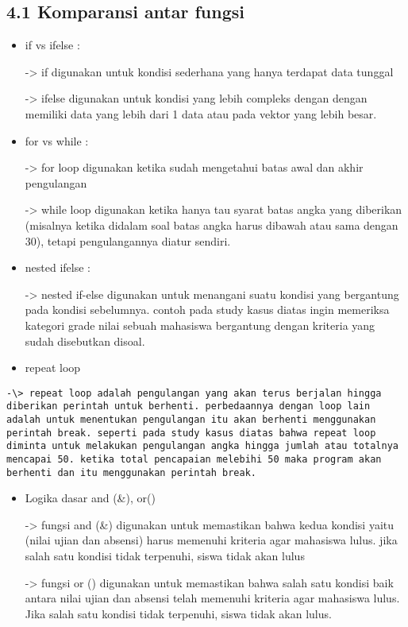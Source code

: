 \documentclass[
]{article}
\begin{document}
\subsection{4.1 Komparansi antar fungsi}\label{komparansi-antar-fungsi}

\begin{itemize}
\item
  if vs ifelse :

  -\textgreater{} if digunakan untuk kondisi sederhana yang hanya
  terdapat data tunggal

  -\textgreater{} ifelse digunakan untuk kondisi yang lebih compleks
  dengan dengan memiliki data yang lebih dari 1 data atau pada vektor
  yang lebih besar.
\item
  for vs while :

  -\textgreater{} for loop digunakan ketika sudah mengetahui batas awal
  dan akhir pengulangan

  -\textgreater{} while loop digunakan ketika hanya tau syarat batas
  angka yang diberikan (misalnya ketika didalam soal batas angka harus
  dibawah atau sama dengan 30), tetapi pengulangannya diatur sendiri.
\item
  nested ifelse :

  -\textgreater{} nested if-else digunakan untuk menangani suatu kondisi
  yang bergantung pada kondisi sebelumnya. contoh pada study kasus
  diatas ingin memeriksa kategori grade nilai sebuah mahasiswa
  bergantung dengan kriteria yang sudah disebutkan disoal.
\item
  repeat loop
\end{itemize}

\begin{verbatim}
-\> repeat loop adalah pengulangan yang akan terus berjalan hingga diberikan perintah untuk berhenti. perbedaannya dengan loop lain adalah untuk menentukan pengulangan itu akan berhenti menggunakan perintah break. seperti pada study kasus diatas bahwa repeat loop diminta untuk melakukan pengulangan angka hingga jumlah atau totalnya mencapai 50. ketika total pencapaian melebihi 50 maka program akan berhenti dan itu menggunakan perintah break.
\end{verbatim}

\begin{itemize}
\item
  Logika dasar and (\&), or(\textbar)

  -\textgreater{} fungsi and (\&) digunakan untuk memastikan bahwa kedua
  kondisi yaitu (nilai ujian dan absensi) harus memenuhi kriteria agar
  mahasiswa lulus. jika salah satu kondisi tidak terpenuhi, siswa tidak
  akan lulus

  -\textgreater{} fungsi or (\textbar) digunakan untuk memastikan bahwa
  salah satu kondisi baik antara nilai ujian dan absensi telah memenuhi
  kriteria agar mahasiswa lulus. Jika salah satu kondisi tidak
  terpenuhi, siswa tidak akan lulus.
\end{itemize}
\end{document}
